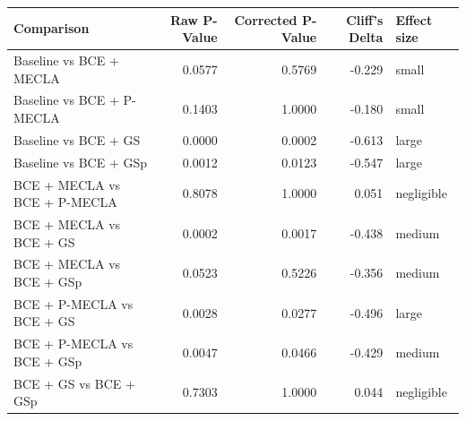 \begin{tabular}{lrrrl}
\toprule
Comparison & Raw P-Value & Corrected P-Value & Cliff's Delta & Effect size \\
\midrule
Baseline vs BCE + MECLA & 0.0577 & 0.5769 & -0.229 & small \\
Baseline vs BCE + P-MECLA & 0.1403 & 1.0000 & -0.180 & small \\
Baseline vs BCE + GS & 0.0000 & 0.0002 & -0.613 & large \\
Baseline vs BCE + GSp & 0.0012 & 0.0123 & -0.547 & large \\
BCE + MECLA vs BCE + P-MECLA & 0.8078 & 1.0000 & 0.051 & negligible \\
BCE + MECLA vs BCE + GS & 0.0002 & 0.0017 & -0.438 & medium \\
BCE + MECLA vs BCE + GSp & 0.0523 & 0.5226 & -0.356 & medium \\
BCE + P-MECLA vs BCE + GS & 0.0028 & 0.0277 & -0.496 & large \\
BCE + P-MECLA vs BCE + GSp & 0.0047 & 0.0466 & -0.429 & medium \\
BCE + GS vs BCE + GSp & 0.7303 & 1.0000 & 0.044 & negligible \\
\bottomrule
\end{tabular}
